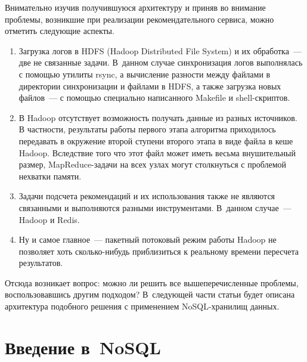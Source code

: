 \begin{multicols}{2}
   Внимательно изучив получившуюся архитектуру и приняв во внимание 
проблемы, возникшие при реализации рекомендательного сервиса, можно 
отметить следующие аспекты.
   \begin{enumerate}[1.]
\item Загрузка логов в HDFS (Hadoop Distributed File System) и их 
обработка~--- две не связанные задачи. В~данном случае синхронизация 
логов выполнялась с помощью утилиты {\sf rsync}, а вы\-чис\-ле\-ние разности между 
файлами в директории синхронизации и файлами в HDFS, а также загрузка 
новых файлов~--- с помощью специально написанного Makefile и 
shell-скрип\-тов.
\item В Hadoop отсутствует возможность получать \mbox{данные} из разных 
источников. В частности, резуль\-та\-ты работы первого этапа алгоритма 
приходилось передавать в окружение второй ступени второго этапа в виде 
файла в кеше Hadoop. Вследствие того что этот файл может иметь весьма 
внушительный размер, MapReduce-за\-да\-чи на всех узлах могут 
столкнуться с проблемой нехватки памяти.
\item Задачи подсчета рекомендаций и их использования также не являются 
связанными и выполняются разными инструментами. В~данном случае~--- 
Hadoop и Redis.
\item Ну и самое главное~--- пакетный потоковый режим работы Hadoop не 
позволяет хоть сколь\-ко-ни\-будь приблизиться к реальному времени 
пересчета результатов.
   \end{enumerate}
   
   Отсюда возникает вопрос: можно ли решить все вышеперечисленные 
проблемы, воспользовавшись другим подходом? В~следующей части статьи 
будет описана архитектура подобного решения с применением 
   NoSQL-хра\-ни\-лищ данных.
   
\section{Введение в~NoSQL}


\end{multicols}
